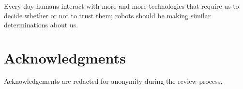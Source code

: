 \documentclass{sig-alternate}
\begin{document}
Every day humans interact with more and more technologies that require
us to decide whether or not to trust them; robots should be making
similar determinations about us.



\section{Acknowledgments}
Acknowledgements are redacted for anonymity during the review process.



%

\end{document}
